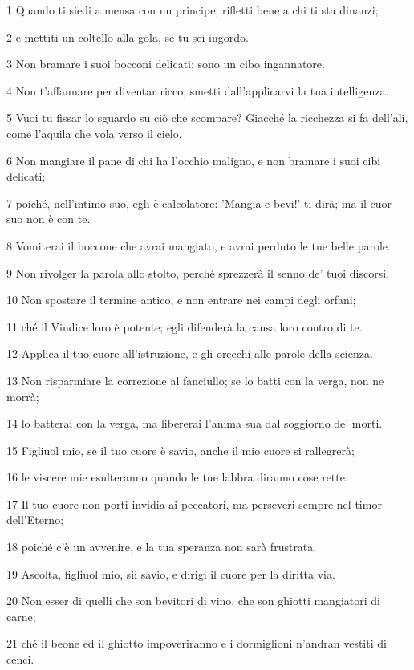 \par 1 Quando ti siedi a mensa con un principe, rifletti bene a chi ti sta dinanzi;
\par 2 e mettiti un coltello alla gola, se tu sei ingordo.
\par 3 Non bramare i suoi bocconi delicati; sono un cibo ingannatore.
\par 4 Non t'affannare per diventar ricco, smetti dall'applicarvi la tua intelligenza.
\par 5 Vuoi tu fissar lo sguardo su ciò che scompare? Giacché la ricchezza si fa dell'ali, come l'aquila che vola verso il cielo.
\par 6 Non mangiare il pane di chi ha l'occhio maligno, e non bramare i suoi cibi delicati;
\par 7 poiché, nell'intimo suo, egli è calcolatore: 'Mangia e bevi!' ti dirà; ma il cuor suo non è con te.
\par 8 Vomiterai il boccone che avrai mangiato, e avrai perduto le tue belle parole.
\par 9 Non rivolger la parola allo stolto, perché sprezzerà il senno de' tuoi discorsi.
\par 10 Non spostare il termine antico, e non entrare nei campi degli orfani;
\par 11 ché il Vindice loro è potente; egli difenderà la causa loro contro di te.
\par 12 Applica il tuo cuore all'istruzione, e gli orecchi alle parole della scienza.
\par 13 Non risparmiare la correzione al fanciullo; se lo batti con la verga, non ne morrà;
\par 14 lo batterai con la verga, ma libererai l'anima sua dal soggiorno de' morti.
\par 15 Figliuol mio, se il tuo cuore è savio, anche il mio cuore si rallegrerà;
\par 16 le viscere mie esulteranno quando le tue labbra diranno cose rette.
\par 17 Il tuo cuore non porti invidia ai peccatori, ma perseveri sempre nel timor dell'Eterno;
\par 18 poiché c'è un avvenire, e la tua speranza non sarà frustrata.
\par 19 Ascolta, figliuol mio, sii savio, e dirigi il cuore per la diritta via.
\par 20 Non esser di quelli che son bevitori di vino, che son ghiotti mangiatori di carne;
\par 21 ché il beone ed il ghiotto impoveriranno e i dormiglioni n'andran vestiti di cenci.
